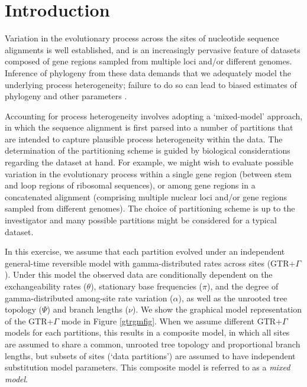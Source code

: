 \section{Introduction}

Variation in the evolutionary process across the sites of nucleotide sequence alignments is well established, and is an increasingly pervasive feature of datasets composed of gene regions sampled from multiple loci and/or different genomes.
Inference of phylogeny from these data demands that we adequately model the underlying process heterogeneity; failure to do so can lead to biased estimates of phylogeny and other parameters \citep{Brown2007}.

Accounting for process heterogeneity involves adopting a `mixed-model' approach, \citep{Ronquist2003} in which the sequence alignment is first parsed into a number of partitions that are intended to capture plausible process heterogeneity within the data.
The determination of the partitioning scheme is guided by biological considerations regarding the dataset at hand.
For example, we might wish to evaluate possible variation in the evolutionary process within a single gene region (\EG between stem and loop regions of ribosomal sequences), or among gene regions in a concatenated alignment (\EG comprising multiple nuclear loci and/or gene regions sampled from different genomes).
The choice of partitioning scheme is up to the investigator and many possible partitions might be considered for a typical dataset.

In this exercise, we assume that each partition evolved under an independent general-time reversible model with gamma-distributed rates across sites (GTR+$\Gamma$). 
Under this model the observed data are conditionally dependent on the exchangeability rates ($\theta$), stationary base frequencies ($\pi$), and the degree of gamma-distributed among-site rate variation ($\alpha$), as well as the unrooted tree topology ($\Psi$) and branch lengths ($\nu$).
We show the graphical model representation of the GTR+$\Gamma$ mode in Figure \ref{gtrgmfig}. 
When we assume different GTR+$\Gamma$ models for each partitions, this results in a composite model, in which all sites are assumed to share a common, unrooted tree topology and proportional branch lengths, but subsets of sites (`data partitions') are assumed to have independent substitution model parameters.
This composite model is referred to as a \emph{mixed model}. 



